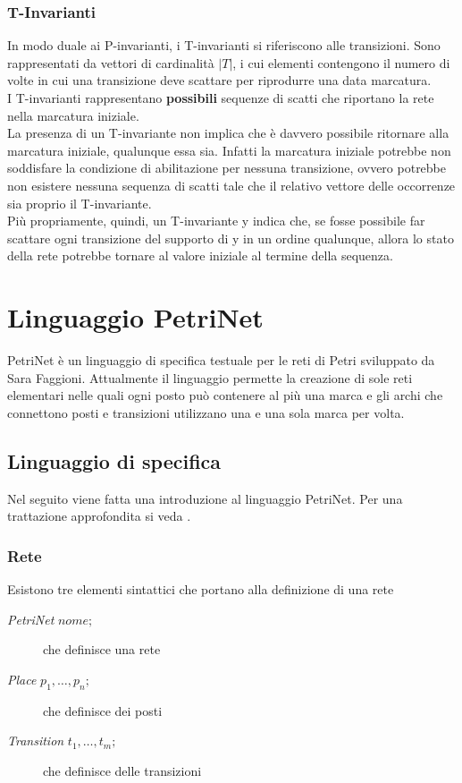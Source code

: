 \documentclass[italian,12pt]{book}
\begin{document}
\subsubsection{T-Invarianti}
In modo duale ai P-invarianti, i T-invarianti si riferiscono alle
transizioni. Sono rappresentati da vettori di cardinalità $|T|$, i cui
elementi contengono il numero di volte in cui una transizione deve
scattare per riprodurre una data marcatura.\\
I T-invarianti rappresentano {\bf possibili} sequenze di scatti che
riportano la rete nella marcatura iniziale. \\
La presenza di un T-invariante non implica che è davvero possibile
ritornare alla marcatura iniziale, qualunque essa sia. Infatti la
marcatura iniziale potrebbe non soddisfare la condizione di
abilitazione per nessuna transizione, ovvero potrebbe non esistere
nessuna sequenza di scatti tale che il relativo vettore delle
occorrenze sia proprio il T-invariante. \\
Più propriamente, quindi, un T-invariante y indica che, se fosse
possibile far scattare ogni transizione del supporto di y in un ordine
qualunque, allora lo stato della rete potrebbe tornare al valore
iniziale al termine della sequenza.

\newpage

\section{Linguaggio PetriNet}\label{sec:linguaggio_petrinet}
PetriNet è un linguaggio di specifica testuale per le reti di Petri
sviluppato da Sara Faggioni\cite{FAG10}. Attualmente il linguaggio permette la
creazione di sole reti elementari nelle quali ogni posto può contenere
al più una marca e gli archi che connettono posti e transizioni
utilizzano una e una sola marca per volta.
% 
\subsection{Linguaggio di specifica}\label{subsec:componenti_del_linguaggio}
% 
Nel seguito viene fatta una introduzione al linguaggio
PetriNet. Per una trattazione approfondita si veda
\cite{FAG10}.
%
\subsubsection{Rete}
Esistono tre elementi sintattici che portano alla definizione di una rete
\begin{description}
\item[\emph{PetriNet} $nome;$] che definisce una rete
\item[\emph{Place} $p_1, \dots ,p_n;$] che definisce dei
  posti
\item[\emph{Transition} $t_1, \dots ,t_m;$] che definisce
  delle transizioni
\end{description}
% 
\end{document}
